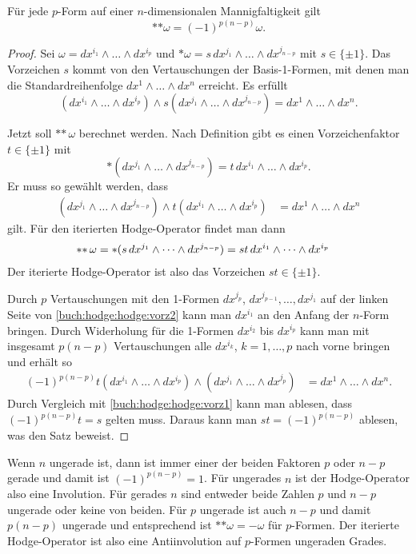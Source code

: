 \begin{satz}
Für jede $p$-Form auf einer $n$-dimensionalen Mannigfaltigkeit gilt
\[
\ast{\ast \omega}
=
(-1)^{p(n-p)}\omega.
\]
\end{satz}

\begin{proof}
Sei $\omega = dx^{i_1}\wedge\dots\wedge dx^{i_p}$ und 
$\ast\omega = s\,dx^{j_1}\wedge\dots\wedge dx^{j_{n-p}}$ mit
$s\in\{\pm 1\}$.
Das Vorzeichen $s$ kommt von den Vertauschungen der Basis-1-Formen,
mit denen man die Standardreihenfolge $dx^1\wedge \dots\wedge dx^n$
erreicht.
Es erfüllt
\begin{equation}
(dx^{i_1}\wedge\dots\wedge dx^{i_p})
\wedge
s(dx^{j_1}\wedge\dots\wedge dx^{j_{n-p}})
=
dx^1\wedge\dots\wedge dx^n.
\label{buch:hodge:hodge:vorz1}
\end{equation}

Jetzt soll $\ast{\ast\,\omega}$ berechnet werden.
Nach Definition gibt es einen Vorzeichenfaktor $t\in\{\pm1\}$ mit
\[
\ast(dx^{j_1}\wedge\dots\wedge dx^{j_{n-p}})
=
t\,dx^{i_1}\wedge\dots\wedge dx^{i_p}.
\]
Er muss so gewählt werden, dass
\begin{align}
(dx^{j_1}\wedge\dots\wedge dx^{j_{n-p}})
\wedge
t(dx^{i_1}\wedge\dots\wedge dx^{i_p})
&=
dx^1\wedge\dots\wedge dx^n
\label{buch:hodge:hodge:vorz2}
\end{align}
gilt.
Für den iterierten Hodge-Operator findet man dann
\begin{align}
\ast{\ast\, \omega}
=
\ast(s\,dx^{j_1}\wedge\dots\wedge dx^{j_{n-p}})
&=
st\, dx^{i_1}\wedge\dots\wedge dx^{i_p}
\notag
\end{align}
Der iterierte Hodge-Operator ist also das Vorzeichen $st\in\{\pm 1\}$.

Durch $p$ Vertauschungen mit den 1-Formen $dx^{j_p}$,
$dx^{j_{p-1}},\dots,dx^{j_1}$ auf der linken Seite von
\eqref{buch:hodge:hodge:vorz2}
kann man $dx^{i_1}$ an den Anfang
der $n$-Form bringen.
Durch Widerholung für die 1-Formen $dx^{i_2}$ bis $dx^{i_p}$ kann
man mit insgesamt $p(n-p)$ Vertauschungen alle $dx^{i_k}$, $k=1,\dots,p$
nach vorne bringen und erhält so
\begin{align}
(-1)^{p(n-p)}
t(dx^{i_1}\wedge\dots\wedge dx^{i_p})
\wedge
(dx^{j_1}\wedge\dots\wedge dx^{j_p})
&=
dx^1\wedge\dots\wedge dx^n.
\end{align}
Durch Vergleich mit 
\eqref{buch:hodge:hodge:vorz1}
kann man ablesen, dass $(-1)^{p(n-p)}t=s$ gelten muss.
Daraus kann man
$st=(-1)^{p(n-p)}$ ablesen, was den Satz beweist.
\end{proof}

Wenn $n$ ungerade ist, dann ist immer einer der beiden Faktoren $p$
oder $n-p$ gerade und damit ist $(-1)^{p(n-p)}=1$.
Für ungerades $n$ ist der Hodge-Operator also eine Involution.
Für gerades $n$ sind entweder beide Zahlen $p$ und $n-p$ ungerade
oder keine von beiden.
Für $p$ ungerade ist auch $n-p$ und damit $p(n-p)$ ungerade
und entsprechend ist $\ast{\ast\omega}=-\omega$ für $p$-Formen.
Der iterierte Hodge-Operator ist also eine Antiinvolution auf
$p$-Formen ungeraden Grades.

